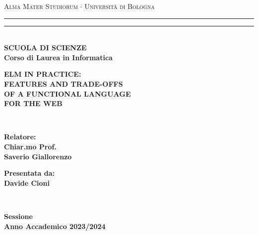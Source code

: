 \begin{titlepage}
    \begin{center}
        {{\Large{\textsc{Alma Mater Studiorum $\cdot$ Università di Bologna}}}}
        \rule[0.1cm]{\textwidth}{0.1mm}
        \rule[0.5cm]{\textwidth}{0.6mm}\\
        {\small{\bf SCUOLA DI SCIENZE\\
            Corso di Laurea in Informatica}}
    \end{center}

    \vspace{25mm}

    \begin{center}
        {\LARGE{\bf ELM IN PRACTICE: }}\\
        \vspace{3mm}
        {\LARGE{\bf FEATURES AND TRADE-OFFS }}\\
        \vspace{3mm}
        {\LARGE{\bf OF A FUNCTIONAL LANGUAGE }}\\
        \vspace{3mm}
        {\LARGE{\bf FOR THE WEB }}\\
    \end{center}

    \vspace{60mm}
    \par
    \noindent
    \begin{minipage}[t]{0.04\textwidth}
        ~
    \end{minipage}
    \begin{minipage}[t]{0.4\textwidth}
        \large{\bf Relatore:\\
            Chiar.mo Prof.\\
            Saverio Giallorenzo}
        \vspace{3mm}\\
    \end{minipage}
    \hfill
    \begin{minipage}[t]{0.4\textwidth}\raggedleft
        {\large{\bf Presentata da:\\
                Davide Cioni}}
    \end{minipage}
    \begin{minipage}[t]{0.04\textwidth}
        ~
    \end{minipage}

    \vspace{20mm}

    \begin{center}
        {\large{\bf {} Sessione\\
                Anno Accademico 2023/2024 }}
    \end{center}
\end{titlepage}
